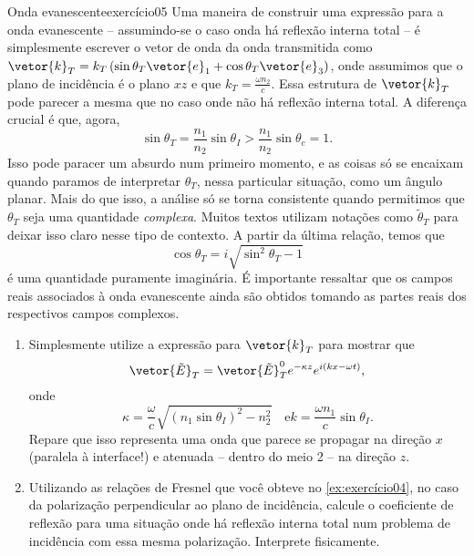 \begin{exercício}{Onda evanescente}{exercício05}
    Uma maneira de construir uma expressão para a onda evanescente -- assumindo-se o caso onda há reflexão interna total -- é simplesmente escrever o vetor de onda da onda transmitida como \(\vetor{k}_T = k_T\left(\sin\theta_T \vetor{e}_1 + \cos\theta_T\vetor{e}_3\right)\), onde assumimos que o plano de incidência é o plano \(xz\) e que \(k_T = \frac{\omega n_2}{c}\). Essa estrutura de \(\vetor{k}_T\) pode parecer a mesma que no caso onde não há reflexão interna total. A diferença crucial é que, agora,
    \begin{equation*}
        \sin\theta_T = \frac{n_1}{n_2} \sin\theta_I > \frac{n_1}{n_2} \sin\theta_c = 1.
    \end{equation*}
    Isso pode paracer um absurdo num primeiro momento, e as coisas só se encaixam quando paramos de interpretar \(\theta_T\), nessa particular situação, como um ângulo planar. Mais do que isso, a análise só se torna consistente quando permitimos que \(\theta_T\) seja uma quantidade \emph{complexa}. Muitos textos utilizam notações como \(\tilde{\theta}_T\) para deixar isso claro nesse tipo de contexto. A partir da última relação, temos que
    \begin{equation*}
        \cos\theta_T = i \sqrt{\sin^2\theta_T - 1}
    \end{equation*}
    é uma quantidade puramente imaginária. É importante ressaltar que os campos reais associados à onda evanescente ainda são obtidos tomando as partes reais dos respectivos campos complexos.
    \begin{enumerate}[label=(\alph*)]
        \item Simplesmente utilize a expressão para \(\vetor{k}_T\) para mostrar que
            \begin{equation*}
                \vetor{\tilde{E}}_T = \vetor{\tilde{E}}_T^0 e^{- \kappa z} e^{i(kx - \omega t)},
            \end{equation*}
            onde
            \begin{equation*}
                \kappa = \frac{\omega}{c}\sqrt{(n_1\sin\theta_I)^2 - n_2^2}\quad\text{e}
                k = \frac{\omega n_1}{c}\sin\theta_I.
            \end{equation*}
            Repare que isso representa uma onda que parece se propagar na direção \(x\) (paralela à interface!) e atenuada -- dentro do meio 2 -- na direção \(z\).
        \item Utilizando as relações de Fresnel que você obteve no \cref{ex:exercício04}, no caso da polarização perpendicular ao plano de incidência, calcule o coeficiente de reflexão para uma situação onde há reflexão interna total num problema de incidência com essa mesma polarização. Interprete fisicamente.

\end{enumerate}
\end{exercício}

